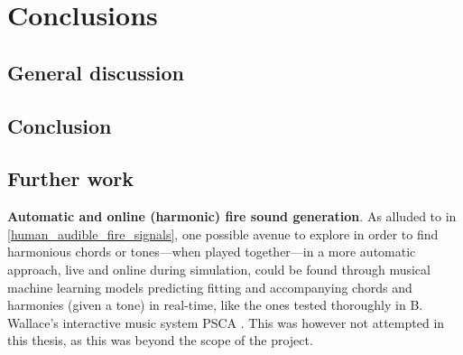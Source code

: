 \chapter{Conclusions} %
\label{chap:conclusions}







\section{General discussion}



\section{Conclusion}



\section{Further work}

\textbf{Automatic and online (harmonic) fire sound generation}. As alluded to in \ref{human_audible_fire_signals}, one possible avenue to explore in order to find harmonious chords or tones—when played together—in a more automatic approach, live and online during simulation, could be found through musical machine learning models predicting fitting and accompanying chords and harmonies (given a tone) in real-time, like the ones tested thoroughly in B. Wallace's interactive music system PSCA \cite{wallace_PSCA}. This was however not attempted in this thesis, as this was beyond the scope of the project.

